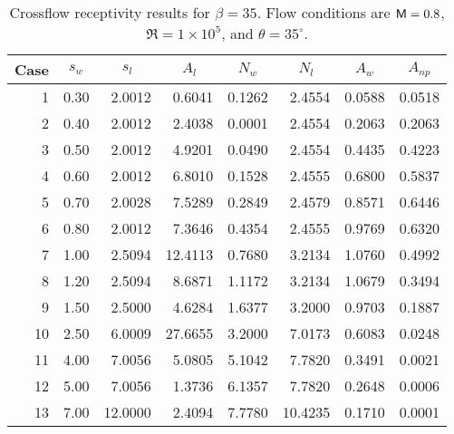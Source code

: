 \begin{table}[p]
\centering
\begin{tabular}{|r||r|r|r|r|r|r|r|}
\hline
\multicolumn{1}{|c||}{Case} & 
\multicolumn{1}{c|}{$s_w$} & 
\multicolumn{1}{c|}{$s_l$} & 
\multicolumn{1}{c|}{$A_l$} & 
\multicolumn{1}{c|}{$N_w$} & 
\multicolumn{1}{c|}{$N_l$} & 
\multicolumn{1}{c|}{$A_w$} & 
\multicolumn{1}{c|}{$A_{np}$} \\ \hline \hline
1 & 0.30 & 2.0012 & 0.6041 & 0.1262 & 2.4554 & 0.0588 & 0.0518  \\ \hline
2 & 0.40 & 2.0012 & 2.4038 & 0.0001 & 2.4554 & 0.2063 & 0.2063  \\ \hline
3 & 0.50 & 2.0012 & 4.9201 & 0.0490 & 2.4554 & 0.4435 & 0.4223  \\ \hline
4 & 0.60 & 2.0012 & 6.8010 & 0.1528 & 2.4555 & 0.6800 & 0.5837  \\ \hline
5 & 0.70 & 2.0028 & 7.5289 & 0.2849 & 2.4579 & 0.8571 & 0.6446  \\ \hline
6 & 0.80 & 2.0012 & 7.3646 & 0.4354 & 2.4555 & 0.9769 & 0.6320  \\ \hline
7 & 1.00 & 2.5094 & 12.4113 & 0.7680 & 3.2134 & 1.0760 & 0.4992  \\ \hline
8 & 1.20 & 2.5094 & 8.6871 & 1.1172 & 3.2134 & 1.0679 & 0.3494  \\ \hline
9 & 1.50 & 2.5000 & 4.6284 & 1.6377 & 3.2000 & 0.9703 & 0.1887  \\ \hline
10 & 2.50 & 6.0009 & 27.6655 & 3.2000 & 7.0173 & 0.6083 & 0.0248  \\ \hline
11 & 4.00 & 7.0056 & 5.0805 & 5.1042 & 7.7820 & 0.3491 & 0.0021  \\ \hline
12 & 5.00 & 7.0056 & 1.3736 & 6.1357 & 7.7820 & 0.2648 & 0.0006  \\ \hline
13 & 7.00 & 12.0000 & 2.4094 & 7.7780 & 10.4235 & 0.1710 & 0.0001  \\ \hline
\end{tabular}
\caption[Crossflow receptivity results for $\beta=35$] {Crossflow receptivity
results for $\beta=35$. Flow conditions are ${\sf M}=0.8$, $\Re=1\times 10^5$, and
$\theta=35^\circ$. \label{t:beta35} }
\end{table}

\clearpage

